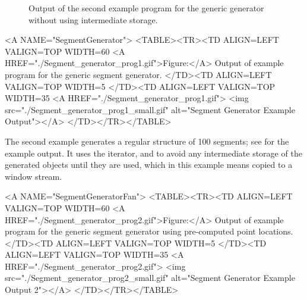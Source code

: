 \begin{ccTexOnly}
\begin{figure}
\begin{minipage}[t]{0.45\textwidth}
      \caption{Output of the second example program for the generic
        generator without using intermediate storage.}
      \label{figureSegmentGeneratorFan}
    \end{minipage}%
  \end{figure}
\end{ccTexOnly}


\begin{ccHtmlOnly}
  <A NAME="SegmentGenerator">
  <TABLE><TR><TD ALIGN=LEFT VALIGN=TOP WIDTH=60%
    <A HREF="./Segment_generator_prog1.gif">Figure:</A>
    Output of example program for the generic segment generator.
  </TD><TD ALIGN=LEFT VALIGN=TOP WIDTH=5%
  </TD><TD ALIGN=LEFT VALIGN=TOP WIDTH=35%
    <A HREF="./Segment_generator_prog1.gif">
        <img src="./Segment_generator_prog1_small.gif" 
             alt="Segment Generator Example Output"></A>
  </TD></TR></TABLE>
\end{ccHtmlOnly}

The second example generates a regular structure of 100 segments; see 
 for the example
output. It uses the %
 iterator,
%
and %
to avoid any intermediate storage of the generated objects until they are
used, which in this example means copied to a window stream.


\begin{ccHtmlOnly}
  <A NAME="SegmentGeneratorFan">
  <TABLE><TR><TD ALIGN=LEFT VALIGN=TOP WIDTH=60%
    <A HREF="./Segment_generator_prog2.gif">Figure:</A>
    Output of example program for the generic segment generator using
    pre-computed point locations.
  </TD><TD ALIGN=LEFT VALIGN=TOP WIDTH=5%
  </TD><TD ALIGN=LEFT VALIGN=TOP WIDTH=35%
    <A HREF="./Segment_generator_prog2.gif">
        <img src="./Segment_generator_prog2_small.gif" 
             alt="Segment Generator Example Output 2"></A>
  </TD></TR></TABLE>
\end{ccHtmlOnly}


\ccParDims
\cgalColumnLayout



\ccParDims
\beforecprogskip\parskip
{}


